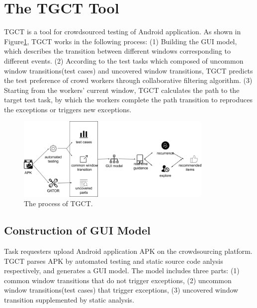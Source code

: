 \section{The TGCT Tool}
TGCT is a tool for crowdsourced testing of Android application. As shown in Figure\ref{fig:arch}, TGCT works in the following process: (1) Building the GUI model, which describes the transition between different windows corresponding to different events. (2) According to the test tasks which composed of uncommon window transitions(test cases) and uncovered window transitions, TGCT predicts the test preference of crowd workers through collaborative filtering algorithm. (3) Starting from the workers' current window, TGCT calculates the path to the target test task, by which the workers complete the path transition to reproduces the exceptions or triggers new exceptions.
\begin{figure}[htbp]
\centering
\centerline{\includegraphics[width=\columnwidth,height=4cm]{fig/2.png}}
\caption{The process of TGCT.}
\label{fig:arch}
\end{figure}

\subsection{Construction of GUI Model}
Task requesters upload Android application APK on the crowdsourcing platform. TGCT parses APK by automated testing and static source code anlysis respectively, and generates a GUI model. The model includes three parts:
(1) common window transitions that do not trigger exceptions, (2) uncommon window transitions(test cases) that trigger exceptions, (3) uncovered window transition supplemented by static analysis.

